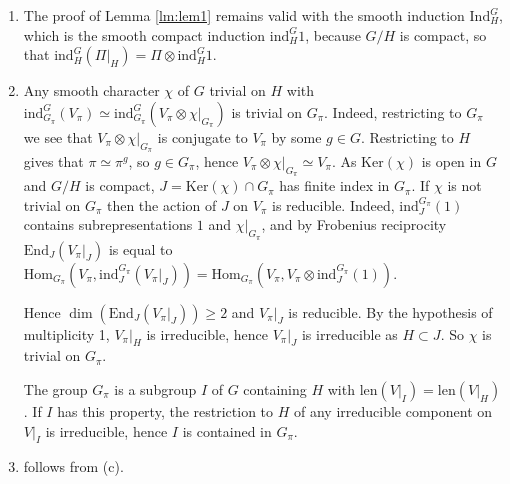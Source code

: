 \documentclass{article}
\begin{document}
\begin{Proof}
\begin{enumerate}
\begin{enumerate}
\item[(b)] The proof of Lemma \ref{lm:lem1} remains valid with the smooth induction \(\mathrm{Ind}_H^G\), which is the smooth compact induction \(\mathrm{ind}_H^G 1\), because \(G/H\) is compact, so that \(\mathrm{ind}_H^G(\Pi|_H) = \Pi \otimes \mathrm{ind}_H^G 1\).

\item[(c)] Any smooth character \(\chi\) of \(G\) trivial on \(H\) with \(\mathrm{ind}_{G_{\pi}}^G(V_{\pi}) \simeq \mathrm{ind}_{G_{\pi}}^G(V_{\pi} \otimes \chi|_{G_{\pi}})\) is trivial on \(G_{\pi}\). Indeed, restricting to \(G_{\pi}\) we see that \(V_{\pi} \otimes \chi|_{G_{\pi}}\) is conjugate to \(V_{\pi}\) by some \(g \in G\). Restricting to \(H\) gives that \(\pi \simeq \pi^g\), so \(g \in G_{\pi}\), hence \(V_{\pi} \otimes \chi|_{G_{\pi}} \simeq V_{\pi}\). As \(\mathrm{Ker}(\chi)\) is open in \(G\) and \(G/H\) is compact, \(J = \mathrm{Ker}(\chi) \cap G_{\pi}\) has finite index in \(G_{\pi}\). If \(\chi\) is not trivial on \(G_{\pi}\) then the action of \(J\) on \(V_{\pi}\) is reducible. Indeed, \(\mathrm{ind}_{J}^{G_{\pi}}(1)\) contains subrepresentations \(1\) and \(\chi|_{G_{\pi}}\), and by Frobenius reciprocity \(\mathrm{End}_J(V_{\pi}|_J)\) is equal to \(\mathrm{Hom}_{G_{\pi}}(V_{\pi}, \mathrm{ind}_J^{G_{\pi}}(V_{\pi}|_J)) = \mathrm{Hom}_{G_{\pi}}(V_{\pi}, V_{\pi} \otimes \mathrm{ind}_J^{G_{\pi}}(1))\).

Hence \(\dim(\mathrm{End}_{J}(V_{\pi}|_J)) \ge 2\) and \(V_{\pi}|_J\) is reducible. By the hypothesis of multiplicity 1, \(V_{\pi}|_H\) is irreducible, hence \(V_{\pi}|_J\) is irreducible as \(H \subset J\). So \(\chi\) is trivial on \(G_{\pi}\).

The group \(G_{\pi}\) is a subgroup \(I\) of \(G\) containing \(H\) with \(\mathrm{len}(V|_I) = \mathrm{len}(V|_H)\). If \(I\) has this property, the restriction to \(H\) of any irreducible component on \(V|_I\) is irreducible, hence \(I\) is contained in \(G_{\pi}\).

\item[(d)] follows from (c).
\end{enumerate}
\end{enumerate}
\end{Proof}
\end{document}
